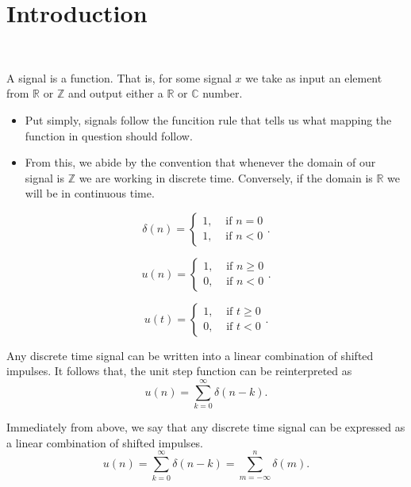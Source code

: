 \section{Introduction}
\begin{definition}[Signal]~

	A signal is a function. That is, for some signal $x$ we take as
	input an element from $\mathbb{R}$ or $\mathbb{Z}$ and output either a
	$\mathbb{R}$ or $\mathbb{C}$ number.
\end{definition}
\begin{itemize}
	\item Put simply, signals follow the funcition rule that tells us what
	      mapping the function in question should follow.
	\item From this, we abide by the convention that whenever the domain
	      of our signal is $\mathbb{Z}$ we are working in discrete time.
	      Conversely, if the domain is $\mathbb{R}$ we will be in
	      continuous time.
\end{itemize}
\begin{definition}
	\[
		\delta(n) = \begin{cases}
			1, & \text{ if }n=0 \\
			1, & \text{ if }n<0
		\end{cases}
		.\]
\end{definition}
\begin{definition}
	\[
		u(n) = \begin{cases}
			1, & \text{ if }n\ge0 \\
			0, & \text{ if }n<0
		\end{cases}
		.\]
\end{definition}
\begin{definition}
	\[
		u(t) = \begin{cases}
			1, & \text{ if }t\ge 0 \\
			0, & \text{ if }t<0
		\end{cases}
		.\]
\end{definition}
\begin{theorem}
	Any discrete time signal can be written into a linear combination of
	shifted impulses. It follows that, the unit step function can be
	reinterpreted as
	\[
		u(n) = \sum_{k=0}^{\infty} \delta(n-k)
		.\]
\end{theorem}
\begin{theorem}
	Immediately from above, we say that any discrete time signal can be
	expressed as a linear combination of shifted impulses.
	\[
		u(n) = \sum_{k=0}^{\infty} \delta(n-k) = \sum_{m=-\infty}^{n} \delta(m)
		.\]
\end{theorem}
